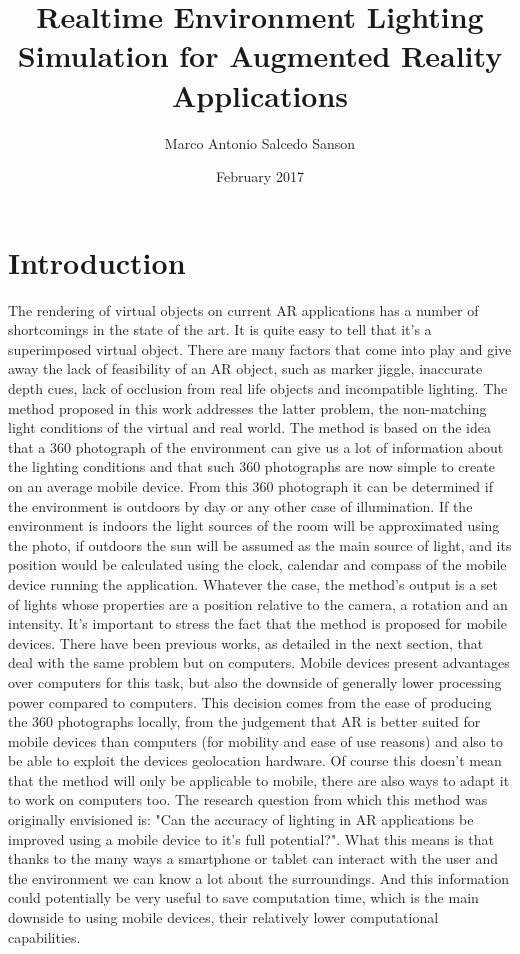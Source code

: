 \documentclass{article}
\title{Realtime Environment Lighting Simulation for Augmented Reality  Applications}
\author{Marco Antonio Salcedo Sanson }
\date{February 2017}
\begin{document}
\maketitle

\section{Introduction}
The rendering of virtual objects on current AR applications has a number of shortcomings in the state of the art. It is quite easy to tell that it’s a superimposed virtual object. There are many factors that come into play and give away the lack of feasibility of an AR object, such as marker jiggle, inaccurate depth cues, lack of occlusion from real life objects and incompatible lighting.
The method proposed in this work addresses the latter problem, the non-matching light conditions of the virtual and real world. The method is based on the idea that a 360 photograph of the environment can give us a lot of information about the lighting conditions and that such 360 photographs are now simple to create on an average mobile device. From this 360 photograph it can be determined if the environment is outdoors by day or any other case of illumination. If the environment is indoors the light sources of the room will be approximated using the photo, if outdoors the sun will be assumed as the main source of light, and its position would be calculated using the clock, calendar and compass of the mobile device running the application. \newline
Whatever the case, the method's output is a set of lights whose properties are a position relative to the camera, a rotation and an intensity.
It's important to stress the fact that the method is proposed for mobile devices. There have been previous works, as detailed in the next section, that deal with the same problem but on computers. Mobile devices present advantages over computers for this task, but also the downside of generally lower processing power compared to computers. This decision comes from the ease of producing the 360 photographs locally, from the judgement that AR is better suited for mobile devices than computers (for mobility and ease of use reasons) and also to be able to exploit the devices geolocation hardware. Of course this doesn't mean that the method will only be applicable to mobile, there are also ways to adapt it to work on computers too.\newline
The research question from which this method was originally envisioned is: "Can the accuracy of lighting in AR applications be improved using a mobile device to it's full potential?". What this means is that thanks to the many ways a smartphone or tablet can interact with the user and the environment we can know a lot about the surroundings. And this information could potentially be very useful to save computation time, which is the main downside to using mobile devices, their relatively lower computational capabilities.\newline
\end{document}
